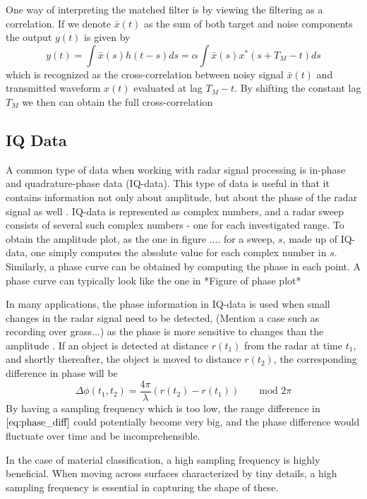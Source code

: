 \documentclass[a4paper, 12pt]{article}
\begin{document}
One way of interpreting the matched filter is by viewing the filtering as a correlation. If we denote $\bar{x}(t)$ as the sum of both target and noise components the output $y(t)$ is given by
%
\begin{equation}
	y(t) = \int \bar{x}(s)h(t-s)ds = \alpha\int \bar{x}(s)x^*(s + T_M - t)ds
\end{equation}
%
which is recognized as the cross-correlation between noisy signal $\bar	{x}(t)$ and transmitted waveform $x(t)$ evaluated at lag $T_M-t$. By shifting the constant lag $T_M$ we then can obtain the full cross-correlation 

\subsection{IQ Data}
A common type of data when working with radar signal processing is in-phase and quadrature-phase data (IQ-data).  This type of data is useful in that it contains information not only about amplitude, but about the phase of the radar signal as well \citep{richards_2014}. IQ-data is represented as complex numbers, and a radar sweep consists of several such complex numbers - one for each investigated range. To obtain the amplitude plot, as the one in figure .... for a sweep, $s$, made up of IQ-data, one simply computes the absolute value for each complex number in $s$. Similarly, a phase curve can be obtained by computing the phase in each point. A phase curve can typically look like the one in *Figure of phase plot*

In many applications, the phase information in IQ-data is used when small changes in the radar signal need to be detected, (Mention a case such as recording over grass...) as the phase is more sensitive to changes than the amplitude \citep{lien_gillian_karagozler_amihood_schwesig_olson_raja_poupyrev_2016}. If an object is detected at distance $r(t_1)$ from the radar at time $t_1$, and shortly thereafter, the object is moved to distance $r(t_2)$, the corresponding difference in phase will be
\begin{equation}
	\label{eq:phase_diff}
	\Delta\phi(t_1, t_2)=\frac{4\pi}{\lambda}(r(t_2)-r(t_1)) \quad\quad \textrm{mod 2$\pi$}
\end{equation}
By having a sampling frequency which is too low, the range difference in $\eqref{eq:phase_diff}$ could potentially become very big, and the phase difference would fluctuate over time and be incomprehensible.

In the case of material classification, a high sampling frequency is highly beneficial. When moving across surfaces characterized by tiny details, a high sampling frequency is essential in capturing the shape of these.
\end{document}
